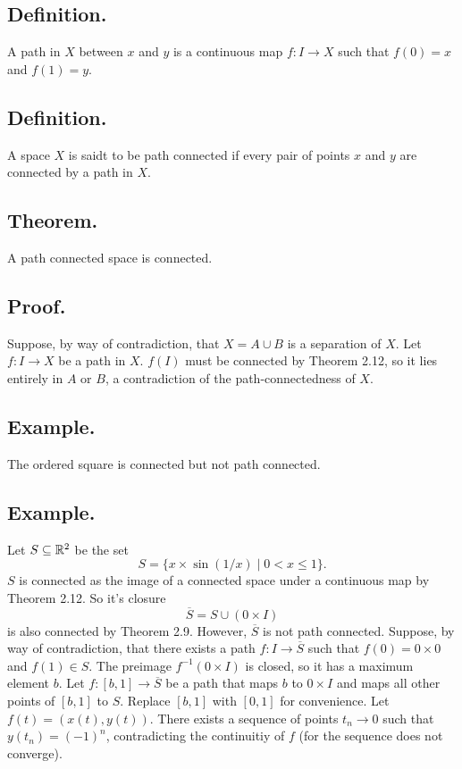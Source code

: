 \documentclass[titlepage]{article}
\begin{document}
\subsection{Definition.} A path in $X$ between $x$ and $y$ is a continuous map $f: I \to X$ such that $f(0) = x$ and $f(1) = y$.

\subsection{Definition.} A space $X$ is saidt to be path connected if every pair of points $x$ and $y$ are connected by a path in $X$.

\subsection{Theorem.} A path connected space is connected.

\subsection{Proof.} Suppose, by way of contradiction, that $X = A \cup B$ is a separation of $X$. Let $f: I \to X$ be a path in $X$. $f(I)$ must be connected by Theorem 2.12, so it lies entirely in $A$ or $B$, a contradiction of the path-connectedness of $X$.

\subsection{Example.} The ordered square is connected but not path connected.

\subsection{Example.} Let $S \subseteq \mathbb{R}^{2}$ be the set 
$$S = \{x \times \sin(1/x) \mid 0 < x \leq 1\}.$$
$S$ is connected as the image of a connected space under a continuous map by Theorem 2.12. So it's closure 
$$\overline{S} = S \cup (0 \times I)$$
is also connected by Theorem 2.9. However, $\overline{S}$ is not path connected. Suppose, by way of contradiction, that there exists a path $f: I \to \overline{S}$ such that $f(0) = 0 \times 0$ and $f(1) \in S$. The preimage $f^{-1}(0 \times I)$ is closed, so it has a maximum element $b$. Let $f: [b, 1] \to \overline{S}$ be a path that maps $b$ to $0 \times I$ and maps all other points of $[b, 1]$ to $S$. Replace $[b, 1]$ with $[0, 1]$ for convenience. Let $f(t) = (x(t), y(t))$. There exists a sequence of points $t_{n} \to 0$ such that $y(t_{n}) = (-1)^{n}$, contradicting the continuitiy of $f$ (for the sequence does not converge).
\end{document}
